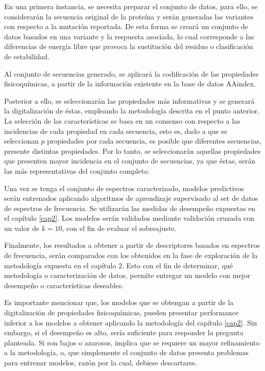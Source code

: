 En una primera instancia, se necesita preparar el conjunto de datos, para ello, se considerarán la secuencia original de la proteína y serán generadas las variantes con respecto a la mutación reportada. De esta forma se creará un conjunto de datos basados en una variante y la respuesta asociada, lo cual corresponde a las diferencias de energía libre que provoca la sustitución del residuo o clasificación de estabilidad.

Al conjunto de secuencias generado, se aplicará la codificación de las propiedades fisicoquímicas, a partir de la información existente en la base de datos AAindex.

Posterior a ello, se seleccionarán las propiedades más informativas y se generará la digitalización de éstas, empleando la metodología descrita en el punto anterior. La selección de las características se basa en un consenso con respecto a las incidencias de cada propiedad en cada secuencia, esto es, dado a que se seleccionan $p$ propiedades por cada secuencia, es posible que diferentes secuencias, presente distintas propiedades. Por lo tanto, se seleccionarán aquellas propiedades que presenten mayor incidencia en el conjunto de secuencias, ya que éstas, serán las más representativas del conjunto completo. 

Una vez se tenga el conjunto de espectros caracterizado, modelos predictivos serán entrenados aplicando algoritmos de aprendizaje supervisado al set de datos de espectros de frecuencia. Se utilizarán las medidas de desempeño expuestas en el capítulo \ref{cap2}. Los modelos serán validados mediante validación cruzada con un valor de $k=10$, con el fin de evaluar el sobreajuste. 

Finalmente, los resultados a obtener a partir de descriptores basados en espectros de frecuencia, serán comparados con los obtenidos en la fase de exploración de la metodología expuesta en el capítulo 2. Esto con el fin de determinar, qué metodología o caracterización de datos, permite entregar un modelo con mejor desempeño o características deseables. 

Es importante mencionar que, los modelos que se obtengan a partir de la digitalización de propiedades fisicoquímicas, pueden presentar  performance inferior a los modelos a obtener aplicando la metodología del capítulo \ref{cap2}. Sin embargo, si el desempeño es alto, sería suficiente para responder la pregunta planteada. Si son bajos o azarosos, implica que se requiere un mayor refinamiento a la metodología, o, que simplemente el conjunto de datos presenta problemas para entrenar modelos, razón por la cual, debiese descartarse. 

